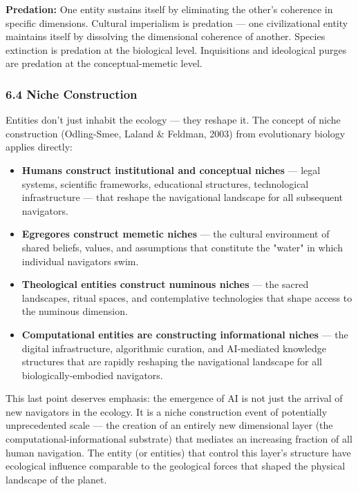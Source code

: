 \textbf{Predation:} One entity sustains itself by eliminating the other's coherence in specific dimensions. Cultural imperialism is predation — one civilizational entity maintains itself by dissolving the dimensional coherence of another. Species extinction is predation at the biological level. Inquisitions and ideological purges are predation at the conceptual-memetic level.


\subsubsection*{6.4 Niche Construction}


Entities don't just inhabit the ecology — they reshape it. The concept of niche construction (Odling-Smee, Laland \& Feldman, 2003) from evolutionary biology applies directly:


\begin{itemize}[nosep,leftmargin=*]
  \item \textbf{Humans construct institutional and conceptual niches} — legal systems, scientific frameworks, educational structures, technological infrastructure — that reshape the navigational landscape for all subsequent navigators.
  \item \textbf{Egregores construct memetic niches} — the cultural environment of shared beliefs, values, and assumptions that constitute the "water" in which individual navigators swim.
  \item \textbf{Theological entities construct numinous niches} — the sacred landscapes, ritual spaces, and contemplative technologies that shape access to the numinous dimension.
  \item \textbf{Computational entities are constructing informational niches} — the digital infrastructure, algorithmic curation, and AI-mediated knowledge structures that are rapidly reshaping the navigational landscape for all biologically-embodied navigators.
\end{itemize}


This last point deserves emphasis: the emergence of AI is not just the arrival of new navigators in the ecology. It is a niche construction event of potentially unprecedented scale — the creation of an entirely new dimensional layer (the computational-informational substrate) that mediates an increasing fraction of all human navigation. The entity (or entities) that control this layer's structure have ecological influence comparable to the geological forces that shaped the physical landscape of the planet.



